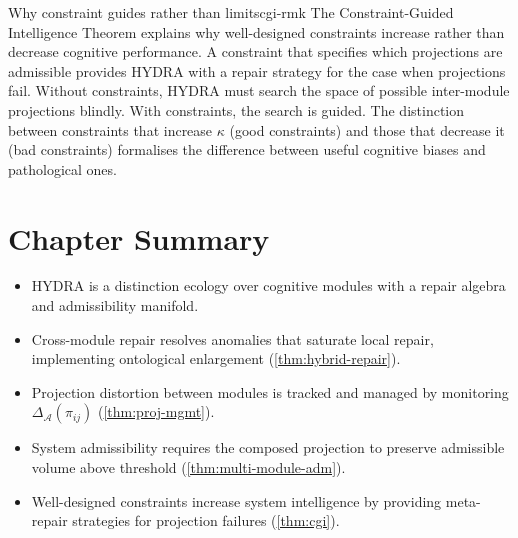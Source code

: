 \documentclass[12pt,twoside,openright]{book}
\newcommand{\adm}{\mathcal{A}}
\newenvironment{chapsummary}{%
  \begin{tcolorbox}[colback=DistBlue!5,colframe=DistBlue,
    title={\faBookOpen\enspace Summary},
    fonttitle=\sffamily\bfseries\color{white},
    attach boxed title to top left={yshift=-2mm,xshift=4mm},
    boxed title style={colback=DistBlue,rounded corners}]
  \begin{itemize}[nosep,leftmargin=*]}{%
  \end{itemize}\end{tcolorbox}}
\begin{document}
\begin{remark}{Why constraint guides rather than limits}{cgi-rmk}
  The Constraint-Guided Intelligence Theorem explains
  why well-designed constraints increase rather than
  decrease cognitive performance. A constraint that
  specifies which projections are admissible provides
  HYDRA with a repair strategy for the case when
  projections fail. Without constraints, HYDRA must
  search the space of possible inter-module projections
  blindly. With constraints, the search is guided.
  The distinction between constraints that increase
  $\kappa$ (good constraints) and those that decrease
  it (bad constraints) formalises the difference between
  useful cognitive biases and pathological ones.
\end{remark}

\section*{Chapter Summary}
\begin{chapsummary}
  \item HYDRA is a distinction ecology over cognitive
        modules with a repair algebra and admissibility
        manifold.
  \item Cross-module repair resolves anomalies that
        saturate local repair, implementing ontological
        enlargement (\cref{thm:hybrid-repair}).
  \item Projection distortion between modules is tracked
        and managed by monitoring
        $\Delta_\adm(\pi_{ij})$
        (\cref{thm:proj-mgmt}).
  \item System admissibility requires the composed
        projection to preserve admissible volume above
        threshold (\cref{thm:multi-module-adm}).
  \item Well-designed constraints increase system
        intelligence by providing meta-repair strategies
        for projection failures (\cref{thm:cgi}).
\end{chapsummary}
\end{document}
